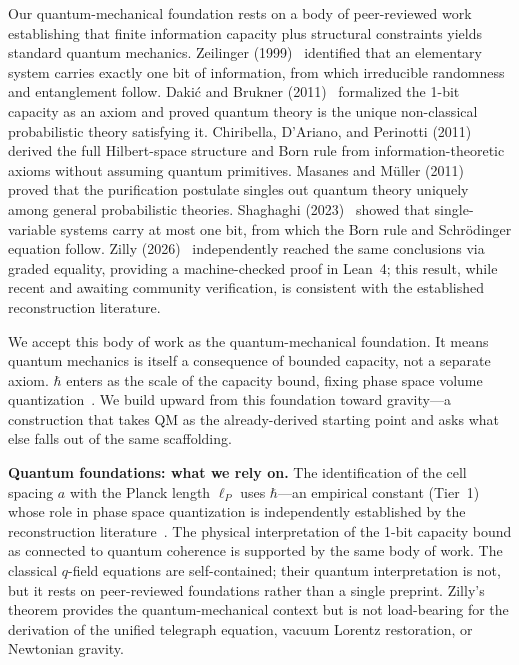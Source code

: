 \documentclass[aps,prd,twocolumn,showpacs,superscriptaddress,preprintnumbers]{revtex4-2}
\begin{document}
Our quantum-mechanical foundation rests on a body of peer-reviewed work establishing that finite information capacity plus structural constraints yields standard quantum mechanics. Zeilinger (1999)~\cite{Zeilinger1999} identified that an elementary system carries exactly one bit of information, from which irreducible randomness and entanglement follow. Daki\'c and Brukner (2011)~\cite{Dakic2011} formalized the 1-bit capacity as an axiom and proved quantum theory is the unique non-classical probabilistic theory satisfying it. Chiribella, D'Ariano, and Perinotti (2011)~\cite{Chiribella2011} derived the full Hilbert-space structure and Born rule from information-theoretic axioms without assuming quantum primitives. Masanes and M\"uller (2011)~\cite{Masanes2011} proved that the purification postulate singles out quantum theory uniquely among general probabilistic theories. Shaghaghi (2023)~\cite{Shaghaghi2023} showed that single-variable systems carry at most one bit, from which the Born rule and Schr\"odinger equation follow. Zilly (2026)~\cite{Zilly:2026} independently reached the same conclusions via graded equality, providing a machine-checked proof in Lean~4; this result, while recent and awaiting community verification, is consistent with the established reconstruction literature.

We accept this body of work as the quantum-mechanical foundation. It means quantum mechanics is itself a consequence of bounded capacity, not a separate axiom. $\hbar$ enters as the scale of the capacity bound, fixing phase space volume quantization~\cite{Zilly:2026,Shaghaghi2023}.
We build upward from this foundation toward gravity---a construction that takes QM as the already-derived starting point and asks what else falls out of the same scaffolding.

\textbf{Quantum foundations: what we rely on.}
The identification of the cell spacing $a$ with the Planck length $\ell_P$ uses $\hbar$---an empirical constant (Tier~1) whose role in phase space quantization is independently established by the reconstruction literature~\cite{Zeilinger1999,Dakic2011,Chiribella2011,Shaghaghi2023}. The physical interpretation of the 1-bit capacity bound as connected to quantum coherence is supported by the same body of work. The classical $q$-field equations are self-contained; their quantum interpretation is not, but it rests on peer-reviewed foundations rather than a single preprint.
Zilly's theorem provides the quantum-mechanical context but is not load-bearing for the derivation of the unified telegraph equation, vacuum Lorentz restoration, or Newtonian gravity.
\end{document}
